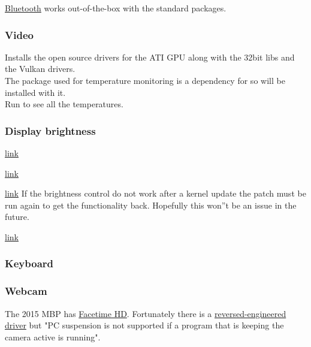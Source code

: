 \href{https://wiki.archlinux.org/index.php/Bluetooth}{Bluetooth} works out-of-the-box with the standard packages.


\subsubsection{Video}
\begin{blocksection}
	Installs the open source drivers for the ATI GPU along with the 32bit libs and the Vulkan drivers.\\
	The \href{https://wiki.archlinux.org/index.php/Lm_sensors}{} package used for temperature monitoring is a dependency for  so will be installed with it.\\
	Run  to see all the temperatures.
\end{blocksection}

\subsubsection{Display brightness}

\href{https://github.com/0xbb/apple_set_os.efi}{link}

\href{https://github.com/Dunedan/mbp-2016-linux/issues/38}{link}


\href{https://bugzilla.kernel.org/show_bug.cgi?id=105051#c37}{link}
If the brightness control do not work after a kernel update the patch must be run again to get the functionality back. Hopefully this won''t be an issue in the future.


\href{https://bugzilla.kernel.org/show_bug.cgi?id=105051#c39}{link}


\subsubsection{Keyboard}



\subsubsection{Webcam}

The 2015 MBP has \href{https://wiki.archlinux.org/index.php/MacBook#Facetime_HD}{Facetime HD}.
Fortunately there is a \href{https://github.com/patjak/bcwc_pcie}{reversed-engineered driver} but "PC suspension is not supported if a 
program that is keeping the camera active is running".

